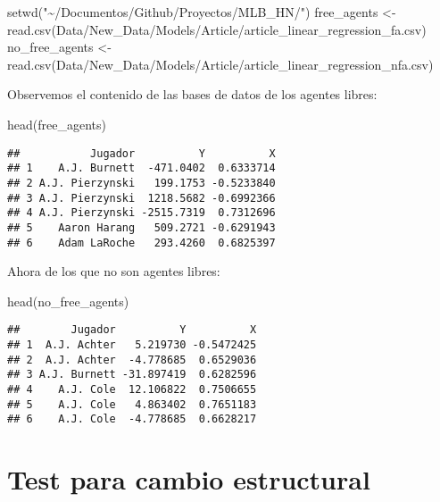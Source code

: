 \documentclass[
]{article}
\newenvironment{Shaded}{\begin{snugshade}}{\end{snugshade}}
\newcommand{\FunctionTok}[1]{\textcolor[rgb]{0.00,0.00,0.00}{#1}}
\newcommand{\NormalTok}[1]{#1}
\newcommand{\OtherTok}[1]{\textcolor[rgb]{0.56,0.35,0.01}{#1}}
\newcommand{\StringTok}[1]{\textcolor[rgb]{0.31,0.60,0.02}{#1}}
\begin{document}
\begin{Shaded}
\begin{Highlighting}[]
\FunctionTok{setwd}\NormalTok{(}\StringTok{"\textasciitilde{}/Documentos/Github/Proyectos/MLB\_HN/"}\NormalTok{)}
\NormalTok{free\_agents }\OtherTok{\textless{}{-}} \FunctionTok{read.csv}\NormalTok{(}\StringTok{\textquotesingle{}Data/New\_Data/Models/Article/article\_linear\_regression\_fa.csv\textquotesingle{}}\NormalTok{)}
\NormalTok{no\_free\_agents }\OtherTok{\textless{}{-}} \FunctionTok{read.csv}\NormalTok{(}\StringTok{\textquotesingle{}Data/New\_Data/Models/Article/article\_linear\_regression\_nfa.csv\textquotesingle{}}\NormalTok{)}
\end{Highlighting}
\end{Shaded}

Observemos el contenido de las bases de datos de los agentes libres:

\begin{Shaded}
\begin{Highlighting}[]
\FunctionTok{head}\NormalTok{(free\_agents)}
\end{Highlighting}
\end{Shaded}

\begin{verbatim}
##           Jugador          Y          X
## 1    A.J. Burnett  -471.0402  0.6333714
## 2 A.J. Pierzynski   199.1753 -0.5233840
## 3 A.J. Pierzynski  1218.5682 -0.6992366
## 4 A.J. Pierzynski -2515.7319  0.7312696
## 5    Aaron Harang   509.2721 -0.6291943
## 6    Adam LaRoche   293.4260  0.6825397
\end{verbatim}

Ahora de los que no son agentes libres:

\begin{Shaded}
\begin{Highlighting}[]
\FunctionTok{head}\NormalTok{(no\_free\_agents)}
\end{Highlighting}
\end{Shaded}

\begin{verbatim}
##        Jugador          Y          X
## 1  A.J. Achter   5.219730 -0.5472425
## 2  A.J. Achter  -4.778685  0.6529036
## 3 A.J. Burnett -31.897419  0.6282596
## 4    A.J. Cole  12.106822  0.7506655
## 5    A.J. Cole   4.863402  0.7651183
## 6    A.J. Cole  -4.778685  0.6628217
\end{verbatim}

\section{Test para cambio estructural}
\end{document}
